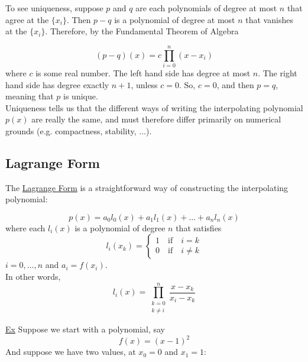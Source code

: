 To see uniqueness, suppose $p$ and $q$ are each polynomials of degree at most $n$ that agree at the $\{x_i\}$. 
Then $p-q$ is a polynomial of degree at most $n$ that vanishes at the $\{x_i\}$. 
Therefore, by the Fundamental Theorem of Algebra

\begin{equation*}
    (p-q)(x) = c \prod_{i=0}^n (x-x_i)
\end{equation*}
where $c$ is some real number. The left hand side has degree at most $n$. The right hand side has degree exactly $n+1$, unless $c=0$. So, $c=0$, and then $p=q$, meaning that $p$ is unique. \\

Uniqueness tells us that the different ways of writing the interpolating polynomial $p(x)$ are really the same, and must therefore differ primarily on numerical grounds (e.g. compactness, stability, ...). \\

\subsection{Lagrange Form}

The \underline{Lagrange Form} is a straightforward way of constructing the interpolating polynomial:

\begin{equation*}
    p(x) = a_0 l_0 (x) + a_1 l_1 (x) + \dots + a_n l_n (x)
\end{equation*}
where each $l_i(x)$ is a polynomial of degree $n$ that satisfies
\begin{equation*}
    l_i(x_k) = \begin{cases}
      1 \quad \mathrm{if} \quad i=k\\
      0 \quad \mathrm{if} \quad i \neq k
    \end{cases}  
\end{equation*}
$i=0,\dots,n$ and $a_i=f(x_i)$. \\

In other words,
\begin{equation*}
    l_i(x) = \prod_{\substack{k=0 \\ k\neq i}}^n \frac{x-x_k}{x_i-x_k}
\end{equation*}

\underline{Ex} Suppose we start with a polynomial, say 
\begin{equation*}
    f(x) = (x-1)^2
\end{equation*}
And suppose we have two values, at $x_0=0$ and $x_1 = 1$:

